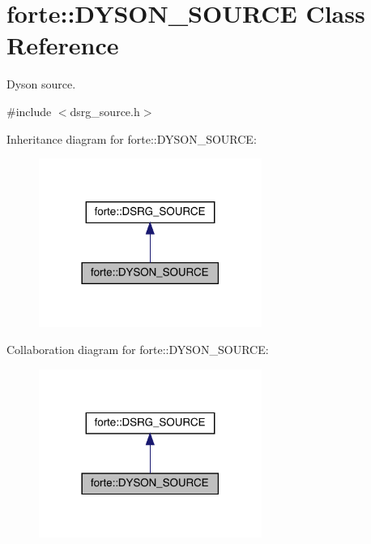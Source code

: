 \hypertarget{classforte_1_1_d_y_s_o_n___s_o_u_r_c_e}{}\section{forte\+:\+:D\+Y\+S\+O\+N\+\_\+\+S\+O\+U\+R\+CE Class Reference}
\label{classforte_1_1_d_y_s_o_n___s_o_u_r_c_e}


Dyson source.  




{\ttfamily \#include $<$dsrg\+\_\+source.\+h$>$}



Inheritance diagram for forte\+:\+:D\+Y\+S\+O\+N\+\_\+\+S\+O\+U\+R\+CE\+:
\nopagebreak
\begin{figure}[H]
\begin{center}
\leavevmode
\includegraphics[width=206pt]{classforte_1_1_d_y_s_o_n___s_o_u_r_c_e__inherit__graph}
\end{center}
\end{figure}


Collaboration diagram for forte\+:\+:D\+Y\+S\+O\+N\+\_\+\+S\+O\+U\+R\+CE\+:
\nopagebreak
\begin{figure}[H]
\begin{center}
\leavevmode
\includegraphics[width=206pt]{classforte_1_1_d_y_s_o_n___s_o_u_r_c_e__coll__graph}
\end{center}
\end{figure}
